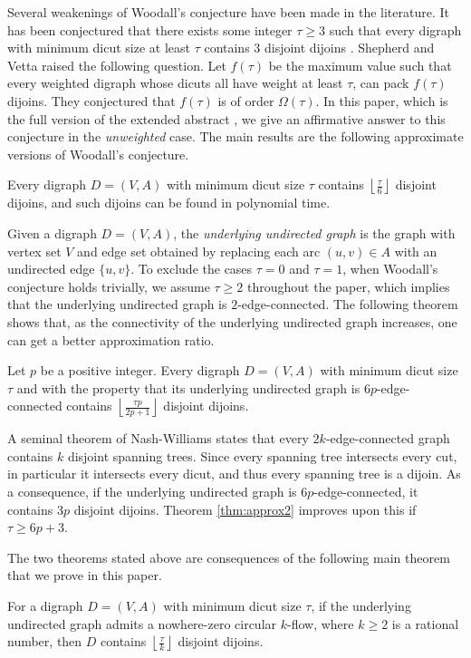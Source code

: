 \documentclass[runningheads]{llncs}
\newcommand{\rounddown}[1]{\left\lfloor#1\right\rfloor}
\begin{document}
Several weakenings of Woodall's conjecture have been made in the literature. It has been conjectured that there exists some integer $\tau\geq 3$ such that every digraph with minimum dicut size at least $\tau$ contains $3$ disjoint dijoins \cite{openproblemtau3}. Shepherd and Vetta \cite{shepherd2005visualizing} raised the following question. Let $f(\tau)$ be the maximum value such that every weighted digraph whose dicuts all have weight at least $\tau$, can pack $f(\tau)$ dijoins. They conjectured that $f(\tau)$ is of order $\Omega(\tau)$. In this paper, which is the full version of the extended abstract \cite{CLR}, we give an affirmative answer to this conjecture in the \textit{unweighted} case. The main results are the following approximate versions of Woodall's conjecture.
\begin{theorem}\label{thm:approx1}
    Every digraph $D=(V,A)$ with minimum dicut size $\tau$ contains $\rounddown{\frac{\tau}{6}}$ disjoint dijoins, and such dijoins can be found in polynomial time.
\end{theorem} 
Given a digraph $D=(V,A)$, the \textit{underlying undirected graph} is the graph with vertex set $V$ and edge set obtained by replacing each arc $(u,v)\in A$ with an undirected edge $\{u,v\}$. To exclude the cases $\tau=0$ and $\tau=1$, when Woodall's conjecture holds trivially, we assume $\tau\geq 2$ throughout the paper, which implies that the underlying undirected graph is $2$-edge-connected. The following theorem shows that, as the connectivity of the underlying undirected graph increases, one can get a better approximation ratio.
\begin{theorem}\label{thm:approx2}
    Let $p$ be a positive integer. Every digraph $D=(V,A)$ with minimum dicut size $\tau$ and with the property that its underlying undirected graph is $6p$-edge-connected contains $\rounddown{\frac{\tau p}{2p+1}}$ disjoint dijoins.
\end{theorem}
A seminal theorem of Nash-Williams \cite{nash1964decomposition} states that every $2k$-edge-connected graph contains $k$ disjoint spanning trees. Since every spanning tree intersects every cut, in particular it intersects every dicut, and thus every spanning tree is a dijoin. As a consequence, if the underlying undirected graph is $6p$-edge-connected, it contains $3p$ disjoint dijoins. Theorem \ref{thm:approx2} improves upon this if $\tau\geq 6p+3$.



The two theorems stated above are consequences of the following main theorem that we prove in this paper.
\begin{theorem}\label{thm:pack_dijoins}
    For a digraph $D=(V,A)$ with minimum dicut size $\tau$, if the underlying undirected graph admits a nowhere-zero circular $k$-flow, where $k\geq 2$ is a rational number, then $D$ contains $\rounddown{\frac{\tau}{k}}$ disjoint dijoins.
\end{theorem} 
\end{document}
